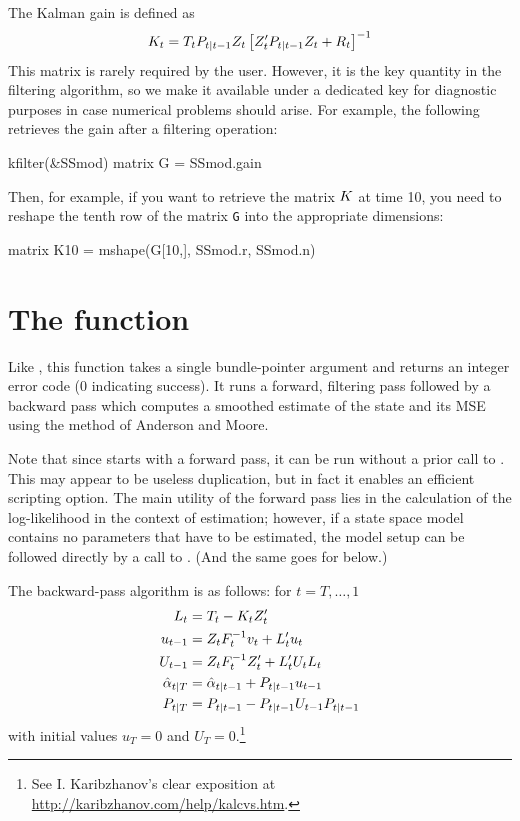 The Kalman gain is defined as 
\[
K_t = T_t P_{t|t-1} Z_t 
\left[Z_t' P_{t|t-1} Z_t + R_t\right]^{-1}
\]
This matrix is rarely required by the user. However, it is the key
quantity in the filtering algorithm, so we make it available under a
dedicated key for diagnostic purposes in case numerical problems
should arise. For example, the following retrieves the gain after a
filtering operation:
%
\begin{code}
kfilter(&SSmod)
matrix G = SSmod.gain
\end{code}

Then, for example, if you want to retrieve the matrix $K$ at time
10, you need to reshape the tenth row of the matrix \texttt{G} into
the appropriate dimensions:
\begin{code}
matrix K10 = mshape(G[10,], SSmod.r, SSmod.n)  
\end{code}

\section{The  function}
\label{sec:ksmooth}

Like , this function takes a single bundle-pointer
argument and returns an integer error code (0 indicating success).  It
runs a forward, filtering pass followed by a backward pass which
computes a smoothed estimate of the state and its MSE using the method
of Anderson and Moore.

Note that since  starts with a forward pass, it can be
run without a prior call to . This may appear to be
useless duplication, but in fact it enables an efficient scripting
option.  The main utility of the forward pass lies in the calculation
of the log-likelihood in the context of estimation; however, if a
state space model contains no parameters that have to be estimated,
the model setup can be followed directly by a call to
. (And the same goes for  below.)

The backward-pass algorithm is as follows: for $t=T,\dots,1$
%
\begin{align*}
L_t &= T_t - K_t Z_t' \\
u_{t-1} &= Z_t F_t^{-1} v_t 
 + L_t' u_t \\
U_{t-1} &= Z_t F_t^{-1} Z_t' + 
  L_t' U_t L_t \\
\hat{\alpha}_{t|T} &= \hat{\alpha}_{t|t-1} + 
  P_{t|t-1} u_{t-1} \\
P_{t|T} &= P_{t|t-1} - 
  P_{t|t-1} U_{t-1} P_{t|t-1}
\end{align*}
%
with initial values $u_T = 0$ and $U_T =
0$.\footnote{See I. Karibzhanov's clear exposition at
\url{http://karibzhanov.com/help/kalcvs.htm}.}

